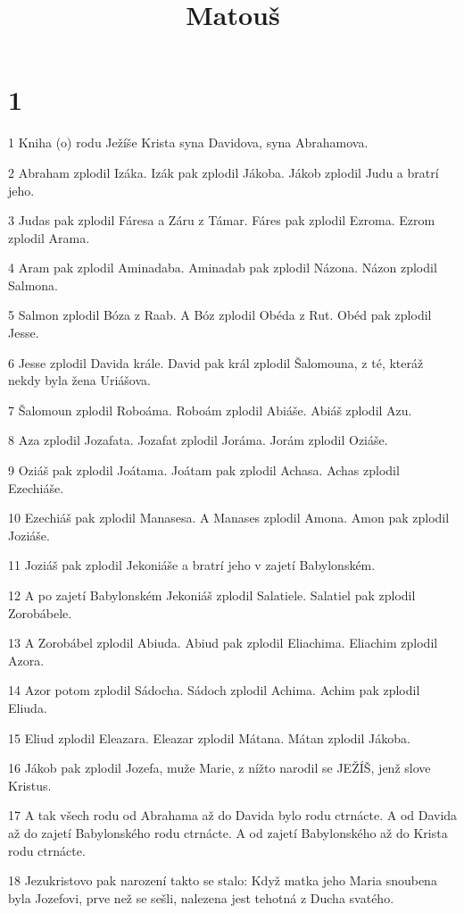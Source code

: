 

\title{Matouš}

\chapter{1}

\par 1 Kniha (o) rodu Ježíše Krista syna Davidova, syna Abrahamova.
\par 2 Abraham zplodil Izáka. Izák pak zplodil Jákoba. Jákob zplodil Judu a bratrí jeho.
\par 3 Judas pak zplodil Fáresa a Záru z Támar. Fáres pak zplodil Ezroma. Ezrom zplodil Arama.
\par 4 Aram pak zplodil Aminadaba. Aminadab pak zplodil Názona. Názon zplodil Salmona.
\par 5 Salmon zplodil Bóza z Raab. A Bóz zplodil Obéda z Rut. Obéd pak zplodil Jesse.
\par 6 Jesse zplodil Davida krále. David pak král zplodil Šalomouna, z té, kteráž nekdy byla žena Uriášova.
\par 7 Šalomoun zplodil Roboáma. Roboám zplodil Abiáše. Abiáš zplodil Azu.
\par 8 Aza zplodil Jozafata. Jozafat zplodil Joráma. Jorám zplodil Oziáše.
\par 9 Oziáš pak zplodil Joátama. Joátam pak zplodil Achasa. Achas zplodil Ezechiáše.
\par 10 Ezechiáš pak zplodil Manasesa. A Manases zplodil Amona. Amon pak zplodil Joziáše.
\par 11 Joziáš pak zplodil Jekoniáše a bratrí jeho v zajetí Babylonském.
\par 12 A po zajetí Babylonském Jekoniáš zplodil Salatiele. Salatiel pak zplodil Zorobábele.
\par 13 A Zorobábel zplodil Abiuda. Abiud pak zplodil Eliachima. Eliachim zplodil Azora.
\par 14 Azor potom zplodil Sádocha. Sádoch zplodil Achima. Achim pak zplodil Eliuda.
\par 15 Eliud zplodil Eleazara. Eleazar zplodil Mátana. Mátan zplodil Jákoba.
\par 16 Jákob pak zplodil Jozefa, muže Marie, z nížto narodil se JEŽÍŠ, jenž slove Kristus.
\par 17 A tak všech rodu od Abrahama až do Davida bylo rodu ctrnácte. A od Davida až do zajetí Babylonského rodu ctrnácte. A od zajetí Babylonského až do Krista rodu ctrnácte.
\par 18 Jezukristovo pak narození takto se stalo: Když matka jeho Maria snoubena byla Jozefovi, prve než se sešli, nalezena jest tehotná z Ducha svatého.
